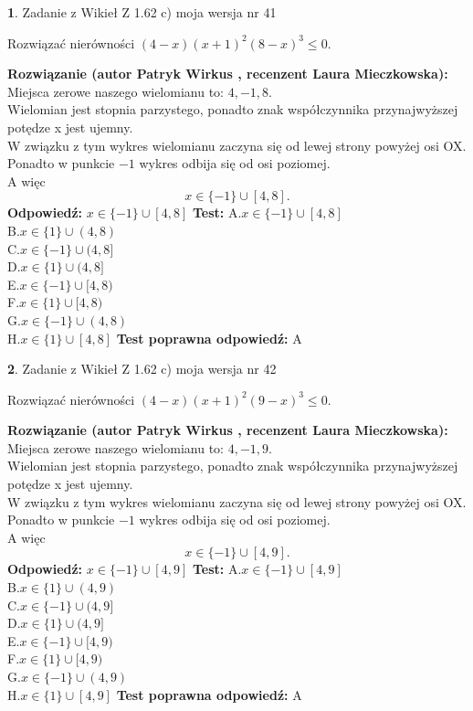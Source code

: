 \documentclass[12pt, a4paper]{article}
\theoremstyle{definition} %
\newtheorem{zad}{}
\newcommand{\zadStart}[1]{\begin{zad}#1\newline}
\newcommand{\zadStop}{\end{zad}}
\newcommand{\rozwStart}[2]{\noindent \textbf{Rozwiązanie (autor #1 , recenzent #2): }\newline}
\newcommand{\rozwStop}{\newline}
\newcommand{\odpStart}{\noindent \textbf{Odpowiedź:}\newline}
\newcommand{\odpStop}{\newline}
\newcommand{\testStart}{\noindent \textbf{Test:}\newline}
\newcommand{\testStop}{\newline}
\newcommand{\kluczStart}{\noindent \textbf{Test poprawna odpowiedź:}\newline}
\newcommand{\kluczStop}{\newline}
\begin{document}
\zadStart{Zadanie z Wikieł Z 1.62 c) moja wersja nr 41}

Rozwiązać nierówności $(4-x)(x+1)^{2}(8-x)^{3}\le0$.
\zadStop
\rozwStart{Patryk Wirkus}{Laura Mieczkowska}
Miejsca zerowe naszego wielomianu to: $4, -1, 8$.\\
Wielomian jest stopnia parzystego, ponadto znak współczynnika przy\linebreak najwyższej potędze x jest ujemny.\\ W związku z tym wykres wielomianu zaczyna się od lewej strony powyżej osi OX.\\
Ponadto w punkcie $-1$ wykres odbija się od osi poziomej.\\
A więc $$x \in \{-1\} \cup [4,8].$$
\rozwStop
\odpStart
$x \in \{-1\} \cup [4,8]$
\odpStop
\testStart
A.$x \in \{-1\} \cup [4,8]$\\
B.$x \in \{1\} \cup (4,8)$\\
C.$x \in \{-1\} \cup (4,8]$\\
D.$x \in \{1\} \cup (4,8]$\\
E.$x \in \{-1\} \cup [4,8)$\\
F.$x \in \{1\} \cup [4,8)$\\
G.$x \in \{-1\} \cup (4,8)$\\
H.$x \in \{1\} \cup [4,8]$
\testStop
\kluczStart
A
\kluczStop



\zadStart{Zadanie z Wikieł Z 1.62 c) moja wersja nr 42}

Rozwiązać nierówności $(4-x)(x+1)^{2}(9-x)^{3}\le0$.
\zadStop
\rozwStart{Patryk Wirkus}{Laura Mieczkowska}
Miejsca zerowe naszego wielomianu to: $4, -1, 9$.\\
Wielomian jest stopnia parzystego, ponadto znak współczynnika przy\linebreak najwyższej potędze x jest ujemny.\\ W związku z tym wykres wielomianu zaczyna się od lewej strony powyżej osi OX.\\
Ponadto w punkcie $-1$ wykres odbija się od osi poziomej.\\
A więc $$x \in \{-1\} \cup [4,9].$$
\rozwStop
\odpStart
$x \in \{-1\} \cup [4,9]$
\odpStop
\testStart
A.$x \in \{-1\} \cup [4,9]$\\
B.$x \in \{1\} \cup (4,9)$\\
C.$x \in \{-1\} \cup (4,9]$\\
D.$x \in \{1\} \cup (4,9]$\\
E.$x \in \{-1\} \cup [4,9)$\\
F.$x \in \{1\} \cup [4,9)$\\
G.$x \in \{-1\} \cup (4,9)$\\
H.$x \in \{1\} \cup [4,9]$
\testStop
\kluczStart
A
\kluczStop
\end{document}
